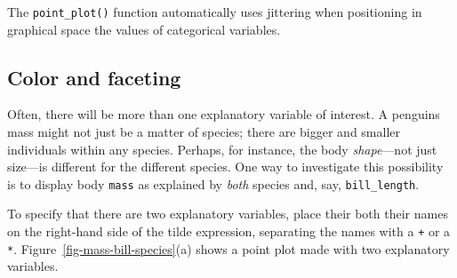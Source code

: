 \documentclass[
  letterpaper,
  DIV=11,
  numbers=noendperiod,
  oneside]{scrartcl}
\begin{document}
The \texttt{point\_plot()} function automatically uses jittering when
positioning in graphical space the values of categorical variables.

\subsection{Color and faceting}\label{color-and-faceting}

Often, there will be more than one explanatory variable of interest. A
penguins mass might not just be a matter of species; there are bigger
and smaller individuals within any species. Perhaps, for instance, the
body \emph{shape}---not just size---is different for the different
species. One way to investigate this possibility is to display body
\texttt{mass} as explained by \emph{both} species and, say,
\texttt{bill\_length}.

To specify that there are two explanatory variables, place their both
their names on the right-hand side of the tilde expression, separating
the names with a \texttt{+} or a \texttt{*}.
Figure~\ref{fig-mass-bill-species}(a) shows a point plot made with two
explanatory variables.
\end{document}
